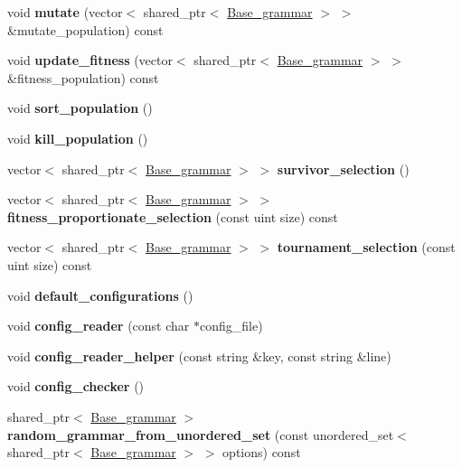 \begin{DoxyCompactItemize}
\item 
\mbox{\label{classEa_a0c0e48e5f92cafe633f0448dfaaf539e}} 
void {\bfseries mutate} (vector$<$ shared\+\_\+ptr$<$ \mbox{\hyperlink{classBase__grammar}{Base\+\_\+grammar}} $>$ $>$ \&mutate\+\_\+population) const
\item 
\mbox{\label{classEa_a5b7027fcff7c9d4f49f24b051aa2e54d}} 
void {\bfseries update\+\_\+fitness} (vector$<$ shared\+\_\+ptr$<$ \mbox{\hyperlink{classBase__grammar}{Base\+\_\+grammar}} $>$ $>$ \&fitness\+\_\+population) const
\item 
\mbox{\label{classEa_ad2e7dfee0fa7a0da5f603e93ec511abf}} 
void {\bfseries sort\+\_\+population} ()
\item 
\mbox{\label{classEa_a9d21e2514f60a6f0e6042634dcbaa58c}} 
void {\bfseries kill\+\_\+population} ()
\item 
\mbox{\label{classEa_a4e7a7793c62955fe08ecfe370a6465e8}} 
vector$<$ shared\+\_\+ptr$<$ \mbox{\hyperlink{classBase__grammar}{Base\+\_\+grammar}} $>$ $>$ {\bfseries survivor\+\_\+selection} ()
\item 
\mbox{\label{classEa_aacc41434939debbdbcb20c06ffb38728}} 
vector$<$ shared\+\_\+ptr$<$ \mbox{\hyperlink{classBase__grammar}{Base\+\_\+grammar}} $>$ $>$ {\bfseries fitness\+\_\+proportionate\+\_\+selection} (const uint size) const
\item 
\mbox{\label{classEa_ab0b6f73569309e7fe5ae684e8a98a1d2}} 
vector$<$ shared\+\_\+ptr$<$ \mbox{\hyperlink{classBase__grammar}{Base\+\_\+grammar}} $>$ $>$ {\bfseries tournament\+\_\+selection} (const uint size) const
\item 
\mbox{\label{classEa_aa7b83967115cdb047e5c6430ca4e9c06}} 
void {\bfseries default\+\_\+configurations} ()
\item 
\mbox{\label{classEa_a1e9958273cd54ef8ee4ec13ae0a92e65}} 
void {\bfseries config\+\_\+reader} (const char $\ast$config\+\_\+file)
\item 
\mbox{\label{classEa_a44060c54603a75a8a0e6078405fb22b8}} 
void {\bfseries config\+\_\+reader\+\_\+helper} (const string \&key, const string \&line)
\item 
\mbox{\label{classEa_a55791bfeca6613be5e0fa2cea3bb6d00}} 
void {\bfseries config\+\_\+checker} ()
\item 
\mbox{\label{classEa_aef4211e0845b00330b2e900aff4f422e}} 
shared\+\_\+ptr$<$ \mbox{\hyperlink{classBase__grammar}{Base\+\_\+grammar}} $>$ {\bfseries random\+\_\+grammar\+\_\+from\+\_\+unordered\+\_\+set} (const unordered\+\_\+set$<$ shared\+\_\+ptr$<$ \mbox{\hyperlink{classBase__grammar}{Base\+\_\+grammar}} $>$ $>$ options) const
\end{DoxyCompactItemize}
